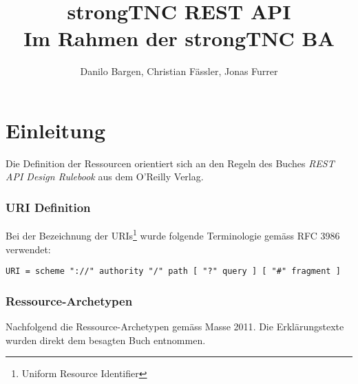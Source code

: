 \documentclass[10pt,a4paper]{scrartcl}
\author{Danilo Bargen, Christian Fässler, Jonas Furrer}
\title{strongTNC REST API \\ \small{Im Rahmen der strongTNC BA} }
\let\textquotedbl="
\begin{document}
\begin{titlepage}
	\maketitle
	\vspace{120mm}
	\thispagestyle{empty} %
\end{titlepage}

\newpage
	\tableofcontents
\newpage

\section{Einleitung}

Die Definition der Ressourcen orientiert sich an den Regeln des Buches
\textit{REST API Design Rulebook}\cite{masse2011rest} aus dem O'Reilly Verlag.

\subsubsection*{URI Definition}

Bei der Bezeichnung der URIs\footnote{Uniform Resource Identifier} wurde
folgende Terminologie gemäss RFC 3986\cite{rfc3986} verwendet:

\texttt{URI = scheme \textquotedbl ://\textquotedbl{} authority \textquotedbl /\textquotedbl{}
path [ \textquotedbl ?\textquotedbl{} query ] [ \textquotedbl \#\textquotedbl{} fragment ]}

\subsubsection*{Ressource-Archetypen}

Nachfolgend die Ressource-Archetypen gemäss Masse 2011\cite{masse2011rest}. Die
Erklärungstexte wurden direkt dem besagten Buch entnommen.
\end{document}
